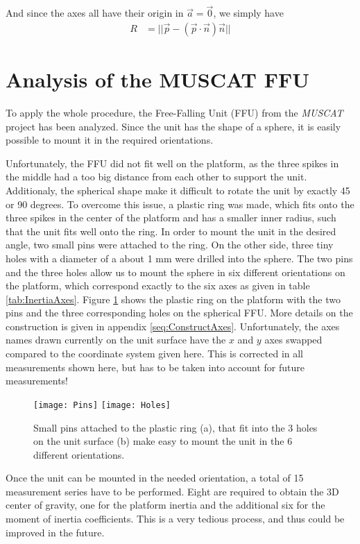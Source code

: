 \documentclass[journal]{IEEEtran}
\begin{document}
And since the axes all have their origin in $\vec{a} = \vec{0}$, we simply have
\begin{align}
	R & = || \vec{p} - (\vec{p} \cdot \vec{n}) \vec{n} ||
\end{align}

\section{Analysis of the MUSCAT FFU}

To apply the whole procedure, the Free-Falling Unit (FFU) from the \emph{MUSCAT} project has been analyzed.
Since the unit has the shape of a sphere, it is easily possible to mount it in the required orientations. 

Unfortunately, the FFU did not fit well on the platform, as the three spikes in the middle had a too big distance from each other to support the unit.
Additionaly, the spherical shape make it difficult to rotate the unit by exactly 45 or 90 degrees.
To overcome this issue, a plastic ring was made, which fits onto the three spikes in the center of the platform and has a smaller inner radius, such that the unit fits well onto the ring.
In order to mount the unit in the desired angle, two small pins were attached to the ring. On the other side, three tiny holes with a diameter of a about 1 mm were drilled into the sphere. The two pins and the three holes allow us to mount the sphere in six different orientations on the platform, which correspond exactly to the six axes as given in table \ref{tab:InertiaAxes}.
Figure \ref{fig:PinsHoles} shows the plastic ring on the platform with the two pins and the three corresponding holes on the spherical FFU.
More details on the construction is given in appendix \ref{seq:ConstructAxes}.
Unfortunately, the axes names drawn currently on the unit surface have the $x$ and $y$ axes swapped compared to the coordinate system given here. This is corrected in all measurements shown here, but has to be taken into account for future measurements!

\begin{figure}
	\centering
	\texttt{[image: Pins]}
	\texttt{[image: Holes]}
	\caption{Small pins attached to the plastic ring (a), that fit into the 3 holes on the unit surface (b) make easy to mount the unit in the 6 different orientations.}
	\label{fig:PinsHoles}
\end{figure}

Once the unit can be mounted in the needed orientation, a total of 15 measurement series have to be performed. Eight are required to obtain the 3D center of gravity, one for the platform inertia and the additional six for the moment of inertia coefficients.
This is a very tedious process, and thus could be improved in the future.
\end{document}
